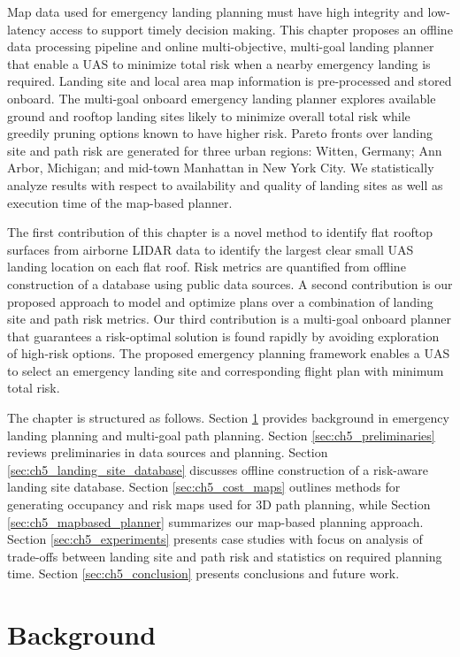 Map data used for emergency landing planning must have high integrity and low-latency access to support timely decision making. This chapter proposes an offline data processing pipeline and online multi-objective, multi-goal landing planner that enable a UAS to minimize total risk when a nearby emergency landing is required. Landing site and local area map information is pre-processed and stored onboard.  The multi-goal onboard emergency landing planner explores available ground and rooftop landing sites likely to minimize overall total risk while greedily pruning options known to have higher risk.   Pareto fronts over landing site and path risk are generated for three urban regions: Witten, Germany; Ann Arbor, Michigan; and mid-town Manhattan in New York City. We statistically analyze results with respect to availability and quality of landing sites as well as execution time of the map-based planner.

The first contribution of this chapter is a novel method to identify flat rooftop surfaces from airborne LIDAR data to identify the largest clear small UAS landing location on each flat roof. Risk metrics are quantified from offline construction of a database using public data sources. A second contribution is our proposed approach to model and optimize plans over a combination of landing site and path risk metrics.  Our third contribution is a multi-goal onboard planner that guarantees a risk-optimal solution is found rapidly by avoiding exploration of high-risk options. The proposed emergency planning framework enables a UAS to select an emergency landing site and  corresponding flight plan with minimum total risk.

The chapter is structured as follows. Section \ref{sec:ch5_background} provides background in emergency landing planning and multi-goal path planning.  Section \ref{sec:ch5_preliminaries} reviews preliminaries in data sources and planning. Section \ref{sec:ch5_landing_site_database} discusses offline construction of a risk-aware landing site database. Section \ref{sec:ch5_cost_maps} outlines methods for generating occupancy and risk maps used for 3D path planning, while Section \ref{sec:ch5_mapbased_planner} summarizes our map-based planning approach. Section \ref{sec:ch5_experiments} presents case studies with focus on analysis of trade-offs between landing site and path risk and statistics on required planning time.  Section \ref{sec:ch5_conclusion} presents conclusions and future work.

\section{Background}\label{sec:ch5_background}

